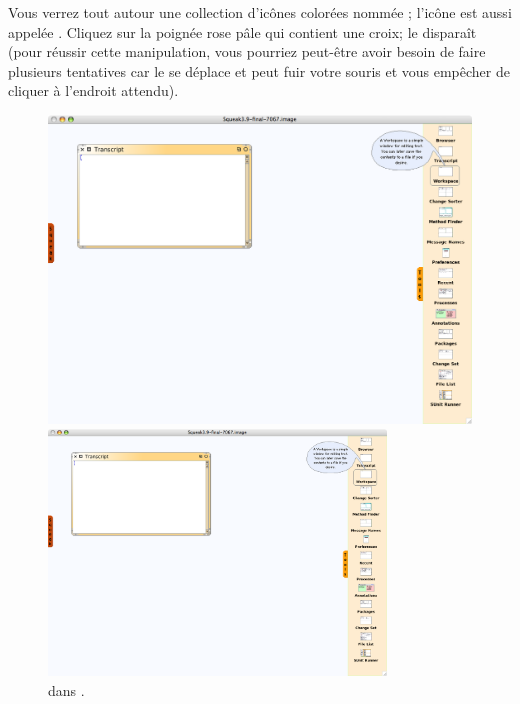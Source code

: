\documentclass[a4paper,10pt,twoside]{book}
\begin{document}
Vous verrez tout autour une collection d'icônes colorées nomm\'ee
; l'ic\^one
 est aussi appel\'ee .
Cliquez sur la poignée rose p\^ale qui contient une croix; le
\blobmorph disparaît (pour réussir cette manipulation, vous pourriez
peut-être avoir besoin de faire plusieurs tentatives car le \blobmorph
se déplace et peut fuir votre souris et vous empêcher de cliquer à
l'endroit attendu).

\begin{figure}[htb]
\ifluluelse
	{\centerline {\includegraphics[width=\textwidth]{Tools}}}
	{\centerline {\includegraphics[width=0.8\textwidth]{Tools}}}
\caption{\Toolsflap dans \sq.\label{fig:tools}}
\end{figure}
\end{document}
